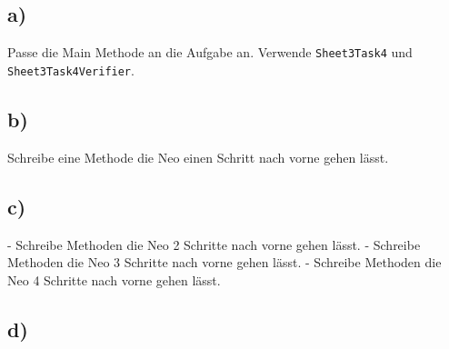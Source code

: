 \subsection*{a)}
	Passe die Main Methode an die Aufgabe an. Verwende \lstinline{Sheet3Task4} und \lstinline{Sheet3Task4Verifier}.
\subsection*{b)}
	Schreibe eine Methode die Neo einen Schritt nach vorne gehen lässt.
\subsection*{c)}
	- Schreibe Methoden die Neo 2 Schritte nach vorne gehen lässt.
	- Schreibe Methoden die Neo 3 Schritte nach vorne gehen lässt.
	- Schreibe Methoden die Neo 4 Schritte nach vorne gehen lässt.
\subsection*{d)}